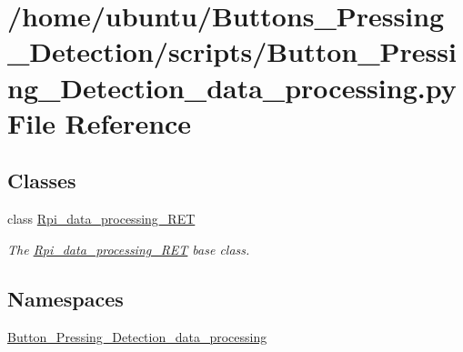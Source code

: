 \hypertarget{a00005}{}\section{/home/ubuntu/\+Buttons\+\_\+\+Pressing\+\_\+\+Detection/scripts/\+Button\+\_\+\+Pressing\+\_\+\+Detection\+\_\+data\+\_\+processing.py File Reference}
\label{a00005}
\subsection*{Classes}
\begin{DoxyCompactItemize}
\item 
class \hyperlink{a00033}{Rpi\+\_\+data\+\_\+processing\+\_\+\+R\+ET}
\begin{DoxyCompactList}\small\item\em The \hyperlink{a00033}{Rpi\+\_\+data\+\_\+processing\+\_\+\+R\+ET} base class. \end{DoxyCompactList}\end{DoxyCompactItemize}
\subsection*{Namespaces}
\begin{DoxyCompactItemize}
\item 
 \hyperlink{a00021}{Button\+\_\+\+Pressing\+\_\+\+Detection\+\_\+data\+\_\+processing}
\end{DoxyCompactItemize}
